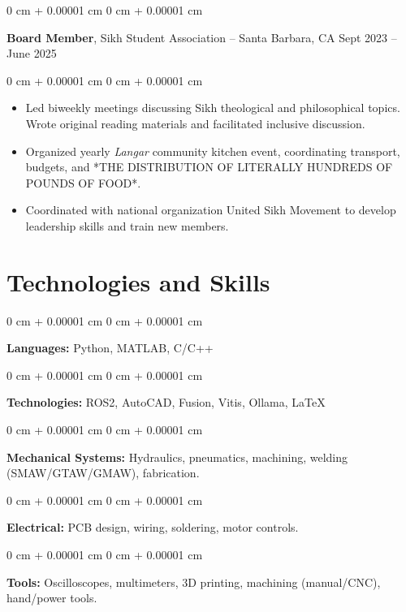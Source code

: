 \documentclass[10pt, letterpaper]{article}
\newenvironment{highlights}{
    \begin{itemize}[
        topsep=0.10 cm,
        parsep=0.10 cm,
        partopsep=0pt,
        itemsep=0pt,
        leftmargin=0 cm + 10pt
    ]
}{
    \end{itemize}
} %
\newenvironment{onecolentry}{
    \begin{adjustwidth}{
        0 cm + 0.00001 cm
    }{
        0 cm + 0.00001 cm
    }
}{
    \end{adjustwidth}
} %
\newenvironment{twocolentry}[2][]{
    \onecolentry
    \def\secondColumn{#2}
    \setcolumnwidth{\fill, 4.5 cm}
    \begin{paracol}{2}
}{
    \switchcolumn \raggedleft \secondColumn
    \end{paracol}
    \endonecolentry
} %
\begin{document}
        \begin{twocolentry}{
            Sept 2023 – June 2025
        }
            \textbf{Board Member}, Sikh Student Association -- Santa Barbara, CA \end{twocolentry}

        \vspace{0.10 cm}
        \begin{onecolentry}
            \begin{highlights}
                \item Led biweekly meetings discussing Sikh theological and philosophical topics. Wrote original reading materials and facilitated  inclusive discussion.
                \item Organized yearly \textit{Langar} community kitchen event, coordinating transport, budgets, and *THE DISTRIBUTION OF LITERALLY HUNDREDS OF POUNDS OF FOOD*.
                \item Coordinated with national organization United Sikh Movement to develop leadership skills and train new members.
            \end{highlights}
        \end{onecolentry}

    \section{Technologies and Skills}

        \begin{onecolentry}
            \textbf{Languages:} Python, MATLAB, C/C++
        \end{onecolentry}

        \vspace{0.1 cm}

        \begin{onecolentry}
            \textbf{Technologies:} ROS2, AutoCAD, Fusion, Vitis, Ollama, \LaTeX
        \end{onecolentry}
        
        \vspace{0.1 cm}

        \begin{onecolentry}
            \textbf{Mechanical Systems:} Hydraulics, pneumatics, machining, welding (SMAW/GTAW/GMAW), fabrication. 
        \end{onecolentry}

        \vspace{0.1 cm}

        \begin{onecolentry}
            \textbf{Electrical:} PCB design, wiring, soldering, motor controls.
        \end{onecolentry}

        \vspace{0.1 cm}

        \begin{onecolentry}
            \textbf{Tools:} Oscilloscopes, multimeters, 3D printing, machining (manual/CNC), hand/power tools.
        \end{onecolentry}
\end{document}

